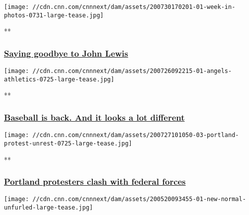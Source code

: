 \href{/2020/07/25/politics/gallery/john-lewis-funeral-ceremonies/index.html}{}

\texttt{[image: //cdn.cnn.com/cnnnext/dam/assets/200730170201-01-week-in-photos-0731-large-tease.jpg]}

**

\hypertarget{saying-goodbye-to-john-lewis}{%
\subsubsection{\texorpdfstring{\href{/2020/07/25/politics/gallery/john-lewis-funeral-ceremonies/index.html}{Saying
goodbye to John
Lewis}}{Saying goodbye to John Lewis}}\label{saying-goodbye-to-john-lewis}}

\href{/2020/07/22/us/gallery/baseball-begins-2020/index.html}{}

\texttt{[image: //cdn.cnn.com/cnnnext/dam/assets/200726092215-01-angels-athletics-0725-large-tease.jpg]}

**

\hypertarget{baseball-is-back-and-it-looks-a-lot-different}{%
\subsubsection{\texorpdfstring{\href{/2020/07/22/us/gallery/baseball-begins-2020/index.html}{Baseball
is back. And it looks a lot
different}}{Baseball is back. And it looks a lot different}}\label{baseball-is-back-and-it-looks-a-lot-different}}

\href{/2020/07/21/us/gallery/portland-protests/index.html}{}

\texttt{[image: //cdn.cnn.com/cnnnext/dam/assets/200727101050-03-portland-protest-unrest-0725-large-tease.jpg]}

**

\hypertarget{portland-protesters-clash-with-federal-forces}{%
\subsubsection{\texorpdfstring{\href{/2020/07/21/us/gallery/portland-protests/index.html}{Portland
protesters clash with federal
forces}}{Portland protesters clash with federal forces}}\label{portland-protesters-clash-with-federal-forces}}

\href{/2020/05/20/world/gallery/new-normal-coronavirus/index.html}{}

\texttt{[image: //cdn.cnn.com/cnnnext/dam/assets/200520093455-01-new-normal-unfurled-large-tease.jpg]}

